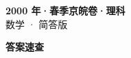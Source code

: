 \documentclass[zihao=-4, a4paper]{ctexart}
\begin{document}
\begin{center}
  {\Large\bfseries 2000 年·春季京皖卷·理科}\\[4pt]
  {\large 数学 · 简答版}
\end{center}
\medskip
{}

\clearpage
{}
\begin{center}{\Large\bfseries 答案速查}\end{center}
\medskip

\end{document}
